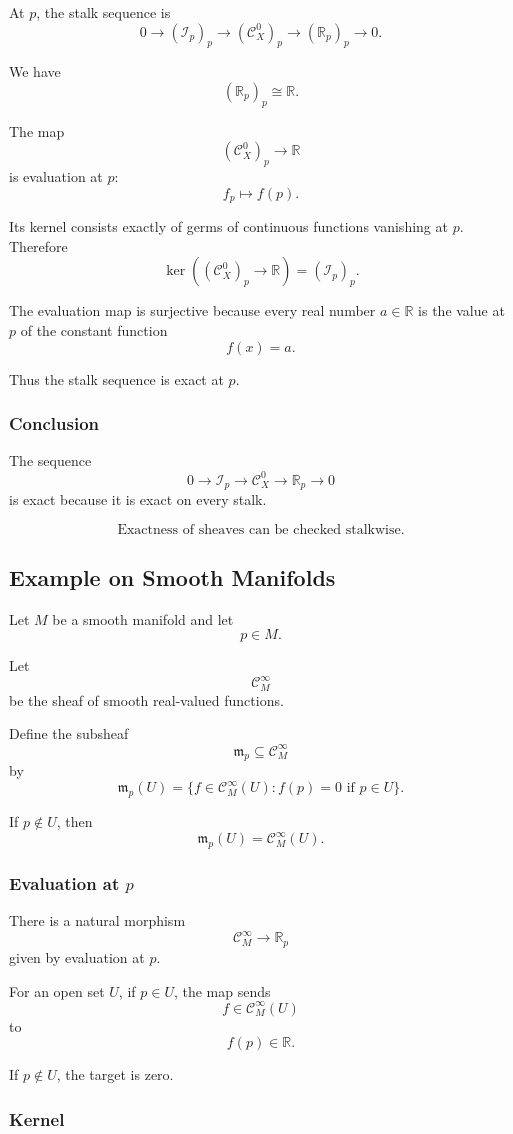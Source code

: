 \documentclass[12pt,a4paper]{article}
\newcommand{\RR}{\mathbb{R}}
\newcommand{\Czero}{\mathcal C^0}        %
\newcommand{\Cinfty}{\mathcal C^\infty}
\theoremstyle{notespace}
\begin{document}
At \(p\), the stalk sequence is
\[
0\to (\mathcal I_p)_p
\to (\Czero_X)_p
\to (\RR_p)_p
\to 0.
\]

We have
\[
(\RR_p)_p\cong \RR.
\]

The map
\[
(\Czero_X)_p\to \RR
\]
is evaluation at \(p\):
\[
f_p\mapsto f(p).
\]

Its kernel consists exactly of germs of continuous functions vanishing at \(p\). Therefore
\[
\ker\left((\Czero_X)_p\to \RR\right)
=
(\mathcal I_p)_p.
\]

The evaluation map is surjective because every real number \(a\in \RR\) is the value at \(p\) of the constant function
\[
f(x)=a.
\]

Thus the stalk sequence is exact at \(p\).

\subsubsection*{Conclusion}

The sequence
\[
0\to \mathcal I_p
\to \Czero_X
\to \RR_p
\to 0
\]
is exact because it is exact on every stalk.

\[
\boxed{
	\text{Exactness of sheaves can be checked stalkwise.}
}
\]

\subsection{Example on Smooth Manifolds}

Let \(M\) be a smooth manifold and let
\[
p\in M.
\]

Let
\[
\Cinfty_M
\]
be the sheaf of smooth real-valued functions.

Define the subsheaf
\[
\mathfrak m_p\subseteq \Cinfty_M
\]
by
\[
\mathfrak m_p(U)
=
\{f\in \Cinfty_M(U): f(p)=0 \text{ if } p\in U\}.
\]

If \(p\notin U\), then
\[
\mathfrak m_p(U)=\Cinfty_M(U).
\]

\subsubsection*{Evaluation at \(p\)}

There is a natural morphism
\[
\Cinfty_M\to \RR_p
\]
given by evaluation at \(p\).

For an open set \(U\), if \(p\in U\), the map sends
\[
f\in \Cinfty_M(U)
\]
to
\[
f(p)\in \RR.
\]

If \(p\notin U\), the target is zero.

\subsubsection*{Kernel}
\end{document}
